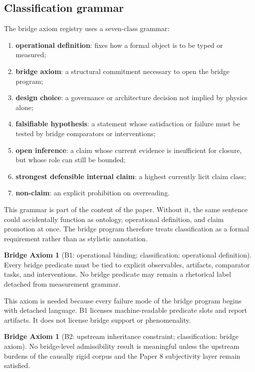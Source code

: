 \documentclass[11pt,a4paper]{article}
\theoremstyle{definition}
\newtheorem{axiom}[theorem]{Bridge Axiom}
\begin{document}
\subsection{Classification grammar}
The bridge axiom registry uses a seven-class grammar:
\begin{enumerate}[leftmargin=1.5em]
\item \textbf{operational definition}: fixes how a formal object is to be typed or measured;
\item \textbf{bridge axiom}: a structural commitment necessary to open the bridge program;
\item \textbf{design choice}: a governance or architecture decision not implied by physics alone;
\item \textbf{falsifiable hypothesis}: a statement whose satisfaction or failure must be tested by bridge comparators or interventions;
\item \textbf{open inference}: a claim whose current evidence is insufficient for closure, but whose role can still be bounded;
\item \textbf{strongest defensible internal claim}: a highest currently licit claim class;
\item \textbf{non-claim}: an explicit prohibition on overreading.
\end{enumerate}

This grammar is part of the content of the paper. Without it, the same sentence could accidentally function as ontology, operational definition, and claim promotion at once. The bridge program therefore treats classification as a formal requirement rather than as stylistic annotation.

\begin{axiom}[B1: operational binding; classification: operational definition]
Every bridge predicate must be tied to explicit observables, artifacts, comparator tasks, and interventions. No bridge predicate may remain a rhetorical label detached from measurement grammar.
\end{axiom}

This axiom is needed because every failure mode of the bridge program begins with detached language. B1 licenses machine-readable predicate slots and report artifacts. It does not license bridge support or phenomenality.

\begin{axiom}[B2: upstream inheritance constraint; classification: bridge axiom]
No bridge-level admissibility result is meaningful unless the upstream burdens of the causally rigid corpus and the Paper 8 subjectivity layer remain satisfied.
\end{axiom}
\end{document}

